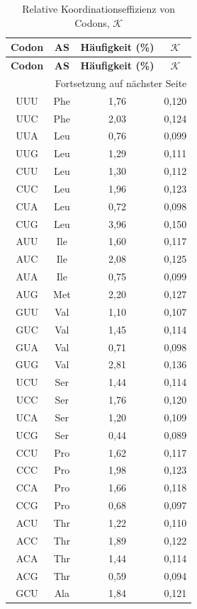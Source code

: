 \documentclass[12pt,a4paper]{article}
\newcommand{\REL}{\mathcal{K}}          %
\begin{document}
	\begin{longtable}{|c|c|c|c|}
		\caption{Relative Koordinationseffizienz von Codons, \(\REL\)}\label{tab:codons}\\
		\hline
		\textbf{Codon} & \textbf{AS} & \textbf{Häufigkeit (\%)} & \(\REL\) \\
		\hline
		\endfirsthead
		\hline
		\textbf{Codon} & \textbf{AS} & \textbf{Häufigkeit (\%)} & \(\REL\) \\
		\hline
		\endhead
		\hline
		\multicolumn{4}{r}{Fortsetzung auf nächster Seite}\\
		\endfoot
		\hline
		\endlastfoot
		UUU & Phe & 1,76 & 0,120 \\
		UUC & Phe & 2,03 & 0,124 \\
		UUA & Leu & 0,76 & 0,099 \\
		UUG & Leu & 1,29 & 0,111 \\
		CUU & Leu & 1,30 & 0,112 \\
		CUC & Leu & 1,96 & 0,123 \\
		CUA & Leu & 0,72 & 0,098 \\
		CUG & Leu & 3,96 & 0,150 \\
		AUU & Ile & 1,60 & 0,117 \\
		AUC & Ile & 2,08 & 0,125 \\
		AUA & Ile & 0,75 & 0,099 \\
		AUG & Met & 2,20 & 0,127 \\
		GUU & Val & 1,10 & 0,107 \\
		GUC & Val & 1,45 & 0,114 \\
		GUA & Val & 0,71 & 0,098 \\
		GUG & Val & 2,81 & 0,136 \\
		UCU & Ser & 1,44 & 0,114 \\
		UCC & Ser & 1,76 & 0,120 \\
		UCA & Ser & 1,20 & 0,109 \\
		UCG & Ser & 0,44 & 0,089 \\
		CCU & Pro & 1,62 & 0,117 \\
		CCC & Pro & 1,98 & 0,123 \\
		CCA & Pro & 1,66 & 0,118 \\
		CCG & Pro & 0,68 & 0,097 \\
		ACU & Thr & 1,22 & 0,110 \\
		ACC & Thr & 1,89 & 0,122 \\
		ACA & Thr & 1,44 & 0,114 \\
		ACG & Thr & 0,59 & 0,094 \\
		GCU & Ala & 1,84 & 0,121 \\

\end{longtable}
\end{document}
